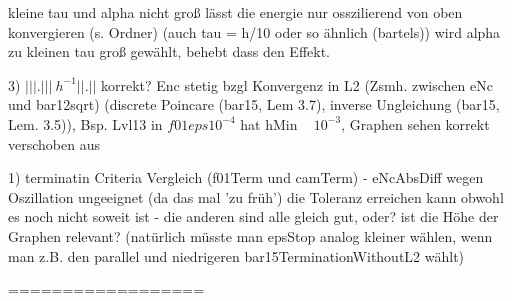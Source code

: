 kleine tau und alpha nicht groß lässt die energie nur osszilierend von oben
konvergieren (s. Ordner) (auch tau = h/10 oder so ähnlich (bartels))
wird alpha zu kleinen tau groß gewählt, behebt dass den Effekt.


3) $|||.||| ~ h^{-1} ||.||$ korrekt? Enc stetig bzgl Konvergenz in L2 (Zsmh. 
   zwischen eNc und bar12sqrt)
   (discrete Poincare (bar15, Lem 3.7), inverse Ungleichung (bar15, Lem. 3.5)),
   Bsp. Lvl13 in $f01eps10^{-4}$ hat hMin ~ $10^{-3}$, Graphen sehen korrekt
   verschoben aus


1) terminatin Criteria Vergleich (f01Term und camTerm)
    - eNcAbsDiff wegen Oszillation ungeeignet (da das mal 'zu früh') die 
      Toleranz erreichen kann obwohl es noch nicht soweit ist
    - die anderen sind alle gleich gut, oder? ist die Höhe der Graphen relevant?
      (natürlich müsste man epsStop analog kleiner wählen, wenn man z.B. den
      parallel und niedrigeren bar15TerminationWithoutL2 wählt)


==================

